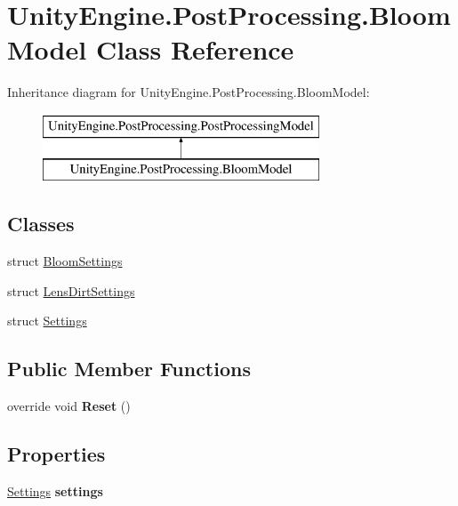 \hypertarget{class_unity_engine_1_1_post_processing_1_1_bloom_model}{}\section{Unity\+Engine.\+Post\+Processing.\+Bloom\+Model Class Reference}
\label{class_unity_engine_1_1_post_processing_1_1_bloom_model}
Inheritance diagram for Unity\+Engine.\+Post\+Processing.\+Bloom\+Model\+:\begin{figure}[H]
\begin{center}
\leavevmode
\includegraphics[height=2.000000cm]{class_unity_engine_1_1_post_processing_1_1_bloom_model}
\end{center}
\end{figure}
\subsection*{Classes}
\begin{DoxyCompactItemize}
\item 
struct \mbox{\hyperlink{struct_unity_engine_1_1_post_processing_1_1_bloom_model_1_1_bloom_settings}{Bloom\+Settings}}
\item 
struct \mbox{\hyperlink{struct_unity_engine_1_1_post_processing_1_1_bloom_model_1_1_lens_dirt_settings}{Lens\+Dirt\+Settings}}
\item 
struct \mbox{\hyperlink{struct_unity_engine_1_1_post_processing_1_1_bloom_model_1_1_settings}{Settings}}
\end{DoxyCompactItemize}
\subsection*{Public Member Functions}
\begin{DoxyCompactItemize}
\item 
\mbox{\label{class_unity_engine_1_1_post_processing_1_1_bloom_model_afe5c14fd79a06f6ca4c0f96ae056ec07}} 
override void {\bfseries Reset} ()
\end{DoxyCompactItemize}
\subsection*{Properties}
\begin{DoxyCompactItemize}
\item 
\mbox{\label{class_unity_engine_1_1_post_processing_1_1_bloom_model_a58a11bd32da6f48ad47d0d819c6d8730}} 
\mbox{\hyperlink{struct_unity_engine_1_1_post_processing_1_1_bloom_model_1_1_settings}{Settings}} {\bfseries settings}
\end{DoxyCompactItemize}


